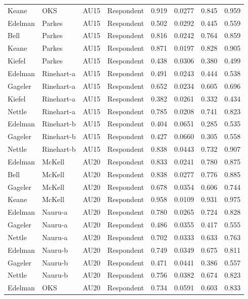 \documentclass{monashthesis}
\begin{document}
\begin{center}
\begin{longtable}{llllllll}
Keane & OKS & AU15 & Respondent & 0.919 & 0.0277 & 0.845 & 0.959 \\
Edelman & Parkes & AU15 & Respondent & 0.502 & 0.0292 & 0.445 & 0.559 \\
Bell & Parkes & AU15 & Respondent & 0.816 & 0.0242 & 0.764 & 0.859 \\
Keane & Parkes & AU15 & Respondent & 0.871 & 0.0197 & 0.828 & 0.905 \\
Kiefel & Parkes & AU15 & Respondent & 0.438 & 0.0306 & 0.380 & 0.499 \\
Edelman & Rinehart-a & AU15 & Respondent & 0.491 & 0.0243 & 0.444 & 0.538 \\
Gageler & Rinehart-a & AU15 & Respondent & 0.652 & 0.0234 & 0.605 & 0.696 \\
Kiefel & Rinehart-a & AU15 & Respondent & 0.382 & 0.0261 & 0.332 & 0.434 \\
Nettle & Rinehart-a & AU15 & Respondent & 0.785 & 0.0208 & 0.741 & 0.823 \\
Edelman & Rinehart-b & AU15 & Respondent & 0.404 & 0.0651 & 0.285 & 0.535 \\
Gageler & Rinehart-b & AU15 & Respondent & 0.427 & 0.0660 & 0.305 & 0.558 \\
Nettle & Rinehart-b & AU15 & Respondent & 0.838 & 0.0443 & 0.732 & 0.907 \\
Edelman & McKell & AU20 & Respondent & 0.833 & 0.0241 & 0.780 & 0.875 \\
Bell & McKell & AU20 & Respondent & 0.838 & 0.0277 & 0.776 & 0.885 \\
Gageler & McKell & AU20 & Respondent & 0.678 & 0.0354 & 0.606 & 0.744 \\
Keane & McKell & AU20 & Respondent & 0.958 & 0.0109 & 0.931 & 0.975 \\
Edelman & Nauru-a & AU20 & Respondent & 0.780 & 0.0265 & 0.724 & 0.828 \\
Gageler & Nauru-a & AU20 & Respondent & 0.486 & 0.0355 & 0.417 & 0.555 \\
Nettle & Nauru-a & AU20 & Respondent & 0.702 & 0.0333 & 0.633 & 0.763 \\
Edelman & Nauru-b & AU20 & Respondent & 0.749 & 0.0349 & 0.675 & 0.811 \\
Gageler & Nauru-b & AU20 & Respondent & 0.471 & 0.0441 & 0.386 & 0.557 \\
Nettle & Nauru-b & AU20 & Respondent & 0.756 & 0.0382 & 0.674 & 0.823 \\
Edelman & OKS & AU20 & Respondent & 0.734 & 0.0591 & 0.603 & 0.833 \\

\end{longtable}
\end{center}
\end{document}
